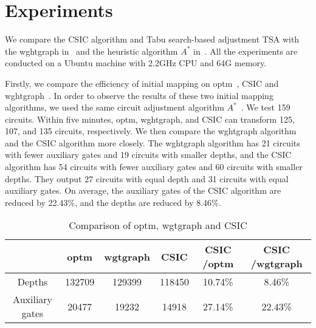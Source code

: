 \documentclass[journal]{IEEEtran}
\begin{document}
\section{Experiments}
\label{Experiment}
We compare the  CSIC  algorithm 
and Tabu search-based adjustment TSA with the wghtgraph in~\cite{2020Qubit} and the heuristic algorithm $ A^{*}$  in~\cite{Zulehner2017}.
All the experiments are conducted on a Ubuntu machine with 2.2GHz CPU and 64G memory. 
 
Firstly, we compare the efficiency of initial mapping on optm~\cite{Zulehner2017},  CSIC and wghtgraph~\cite{2020Qubit}. In order to  observe the results of these two initial mapping algorithms, we used the same circuit adjustment algorithm $A^{*}$~\cite{Zulehner2017}.
We test 159 circuits. Within five minutes, optm,  wghtgraph, and CSIC can transform 125, 107, and  135 circuits, respectively. %
We then compare the wghtgraph algorithm and the CSIC algorithm more closely. The wghtgraph algorithm has 21 circuits with fewer auxiliary gates  and 19 circuits with smaller depths, and the CSIC algorithm has 54 circuits with fewer auxiliary gates and 60 circuits with  smaller depths. They output 27 circuits with equal depth and  31 circuits with equal auxiliary gates. On average, the auxiliary gates of the CSIC algorithm are reduced by 22.43\%, 
and the depths are reduced by 8.46\%.
\begin{table*}[htbp]
	\begin{center}  
	\begin{tabular}{|c|c|c|c|c|c|}
	\hline
	    	&  optm & wgtgraph &CSIC & CSIC /optm & CSIC /wgtgraph\\
	\hline
	 Depths 	&	132709	&   129399	&  118450 	& 10.74\%  &8.46\%   \\
	\hline
	 Auxiliary gates 	&	20477	&  19232 	&  14918 & 27.14\% 	&  22.43\%  \\
	\hline
	\end{tabular} 
	\end{center} 
	\caption{Comparison of optm, wgtgraph and CSIC}
	\label{tab1}
	\end{table*}
\end{document}
